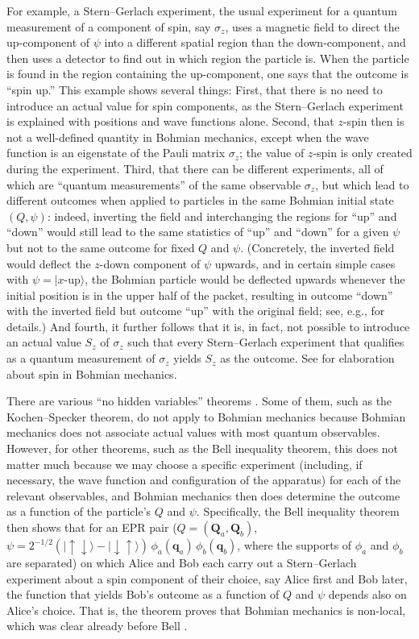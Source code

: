 \documentclass[12pt]{article}
\newcommand{\vQ}{\boldsymbol{Q}}
\newcommand{\vq}{\boldsymbol{q}}
\begin{document}
For example, a Stern--Gerlach experiment, the usual experiment for a quantum measurement of a component of spin, say $\sigma_z$, uses a magnetic field to direct the up-component of $\psi$ into a different spatial region than the down-component, and then uses a detector to find out in which region the particle is. When the particle is found in the region containing the up-component, one says that the outcome is ``spin up.'' This example shows several things: First, that there is no need to introduce an actual value for spin components, as the Stern--Gerlach experiment is explained with positions and wave functions alone. Second, that $z$-spin then is not a well-defined quantity in Bohmian mechanics, except when the wave function is an eigenstate of the Pauli matrix $\sigma_z$; the value of $z$-spin is only created during the experiment. Third, that there can be different experiments, all of which are ``quantum measurements'' of the same observable $\sigma_z$, but which lead to different outcomes when applied to particles in the same Bohmian initial state $(Q,\psi)$: indeed, inverting the field and interchanging the regions for ``up'' and ``down'' would still lead to the same statistics of ``up'' and ``down'' for a given $\psi$ but not to the same outcome for fixed $Q$ and $\psi$. (Concretely, the inverted field would deflect the $z$-down component of $\psi$ upwards, and in certain simple cases with $\psi=|x\text{-up}\rangle$, the Bohmian particle would be deflected upwards whenever the initial position is in the upper half of the packet, resulting in outcome ``down'' with the inverted field but outcome ``up'' with the original field; see, e.g., \cite[Sec.~V]{Nor14} for details.) And fourth, it further follows that it is, in fact, not possible to introduce an actual value $S_z$ of $\sigma_z$ such that every Stern--Gerlach experiment that qualifies as a quantum measurement of $\sigma_z$ yields $S_z$ as the outcome. See \cite{Nor14} for elaboration about spin in Bohmian mechanics.

There are various ``no hidden variables'' theorems \cite{Bell66,HS11}. Some of them, such as the Kochen--Specker theorem, do not apply to Bohmian mechanics because Bohmian mechanics does not associate actual values with most quantum observables. However, for other theorems, such as the Bell inequality theorem, this does not matter much because we may choose a specific experiment (including, if necessary, the wave function and configuration of the apparatus) for each of the relevant observables, and Bohmian mechanics then does determine the outcome as a function of the particle's $Q$ and $\psi$. Specifically, the Bell inequality theorem then shows that for an EPR pair ($Q=(\vQ_a,\vQ_b)$, $\psi=2^{-1/2} (|\!\uparrow\downarrow\rangle - |\!\downarrow\uparrow\rangle) \, \phi_a(\vq_a)\, \phi_b(\vq_b)$, where the supports of $\phi_a$ and $\phi_b$ are separated) on which Alice and Bob each carry out a Stern--Gerlach experiment about a spin component of their choice, say Alice first and Bob later, the function that yields Bob's outcome as a function of $Q$ and $\psi$ depends also on Alice's choice. That is, the theorem proves that Bohmian mechanics is non-local, which was clear already before Bell \cite[p.~186]{Bohm52}.
\end{document}

